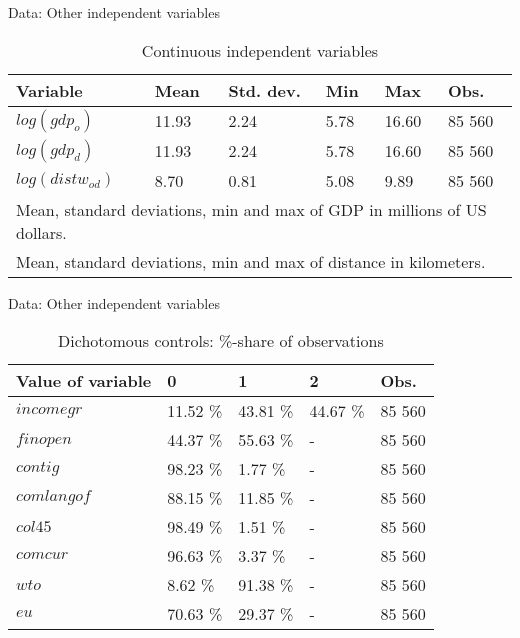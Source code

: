 \documentclass{beamer}
\begin{document}
\begin{frame}{Data: Other independent variables}
\begin{table}[!h]
\centering
\begin{tabular}{ l l l l l l }
\hline
Variable&Mean&Std. dev.&Min&Max&Obs.\\
\hline
$log(gdp_o)$&11.93&2.24&5.78&16.60&85 560 \\
$log(gdp_d)$&11.93&2.24&5.78&16.60&85 560 \\
$log(distw_{od})$&8.70&0.81&5.08&9.89&85 560 \\
\hline
\multicolumn{6}{l}{\footnotesize Mean, standard deviations, min and max of GDP in millions of US dollars.} \\
\multicolumn{6}{l}{\footnotesize Mean, standard deviations, min and max of distance in kilometers.}
\end{tabular}
\caption{Continuous independent variables}
\label{tab:cont}
\end{table}
\end{frame}

\begin{frame}{Data: Other independent variables}
\begin{table}[!h]
\centering
\begin{tabular}{ l l l l l}
\hline
Value of variable&0&1&2&Obs.\\
\hline
$incomegr$ & 11.52 \% & 43.81 \% & 44.67 \% &85 560 \\
$finopen$ & 44.37 \% & 55.63 \% & - & 85 560 \\
$contig$ & 98.23 \% & 1.77 \% & - & 85 560 \\
$comlangof$ & 88.15 \% & 11.85 \% & - & 85 560 \\
$col45$ & 98.49 \% & 1.51 \% & - & 85 560 \\
$comcur$ & 96.63 \% & 3.37 \% & - & 85 560 \\
$wto$ & 8.62 \% & 91.38 \% & - & 85 560 \\
$eu$ & 70.63 \% & 29.37 \% & - & 85 560 \\
\hline
\end{tabular}
\caption{Dichotomous controls: \%-share of observations}
\label{tab:dich}
\end{table}
\end{frame}
\end{document}
